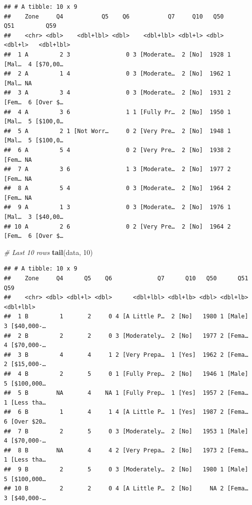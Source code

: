 \documentclass[
]{book}
\newenvironment{Shaded}{\begin{snugshade}}{\end{snugshade}}
\newcommand{\CommentTok}[1]{\textcolor[rgb]{0.56,0.35,0.01}{\textit{#1}}}
\newcommand{\DecValTok}[1]{\textcolor[rgb]{0.00,0.00,0.81}{#1}}
\newcommand{\KeywordTok}[1]{\textcolor[rgb]{0.13,0.29,0.53}{\textbf{#1}}}
\newcommand{\NormalTok}[1]{#1}
\begin{document}
\begin{verbatim}
## # A tibble: 10 x 9
##    Zone     Q4           Q5    Q6           Q7     Q10   Q50     Q51         Q59
##    <chr> <dbl>    <dbl+lbl> <dbl>    <dbl+lbl> <dbl+l> <dbl> <dbl+l>   <dbl+lbl>
##  1 A         2 3                0 3 [Moderate…  2 [No]  1928 1 [Mal…  4 [$70,00…
##  2 A         1 4                0 3 [Moderate…  2 [No]  1962 1 [Mal… NA         
##  3 A         3 4                0 3 [Moderate…  2 [No]  1931 2 [Fem…  6 [Over $…
##  4 A         3 6                1 1 [Fully Pr…  2 [No]  1950 1 [Mal…  5 [$100,0…
##  5 A         2 1 [Not Worr…     0 2 [Very Pre…  2 [No]  1948 1 [Mal…  5 [$100,0…
##  6 A         5 4                0 2 [Very Pre…  2 [No]  1938 2 [Fem… NA         
##  7 A         3 6                1 3 [Moderate…  2 [No]  1977 2 [Fem… NA         
##  8 A         5 4                0 3 [Moderate…  2 [No]  1964 2 [Fem… NA         
##  9 A         1 3                0 3 [Moderate…  2 [No]  1976 1 [Mal…  3 [$40,00…
## 10 A         2 6                0 2 [Very Pre…  2 [No]  1964 2 [Fem…  6 [Over $…
\end{verbatim}

\begin{Shaded}
\begin{Highlighting}[]
\CommentTok{\# Last 10 rows}
\KeywordTok{tail}\NormalTok{(data, }\DecValTok{10}\NormalTok{)}
\end{Highlighting}
\end{Shaded}

\begin{verbatim}
## # A tibble: 10 x 9
##    Zone     Q4      Q5    Q6             Q7      Q10   Q50      Q51          Q59
##    <chr> <dbl> <dbl+l> <dbl>      <dbl+lbl> <dbl+lb> <dbl> <dbl+lb>    <dbl+lbl>
##  1 B         1       2     0 4 [A Little P…  2 [No]   1980 1 [Male] 3 [$40,000-…
##  2 B         2       2     0 3 [Moderately…  2 [No]   1977 2 [Fema… 4 [$70,000-…
##  3 B         4       4     1 2 [Very Prepa…  1 [Yes]  1962 2 [Fema… 2 [$15,000-…
##  4 B         2       5     0 1 [Fully Prep…  2 [No]   1946 1 [Male] 5 [$100,000…
##  5 B        NA       4    NA 1 [Fully Prep…  1 [Yes]  1957 2 [Fema… 1 [Less tha…
##  6 B         1       4     1 4 [A Little P…  1 [Yes]  1987 2 [Fema… 6 [Over $20…
##  7 B         2       5     0 3 [Moderately…  2 [No]   1953 1 [Male] 4 [$70,000-…
##  8 B        NA       4     4 2 [Very Prepa…  2 [No]   1973 2 [Fema… 1 [Less tha…
##  9 B         2       5     0 3 [Moderately…  2 [No]   1980 1 [Male] 5 [$100,000…
## 10 B         2       2     0 4 [A Little P…  2 [No]     NA 2 [Fema… 3 [$40,000-…
\end{verbatim}
\end{document}
